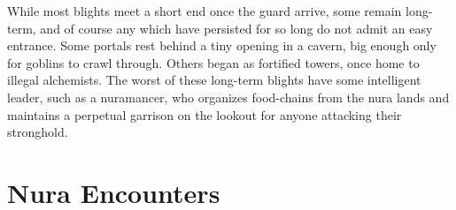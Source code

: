 \begin{multicols}{2}
While most blights meet a short end once the \gls{guard} arrive, some remain long-term, and of course any which have persisted for so long do not admit an easy entrance.
Some portals rest behind a tiny opening in a cavern, big enough only for goblins to crawl through.
Others began as fortified towers, once home to illegal alchemists.
The worst of these long-term blights have some intelligent leader, such as a nuramancer, who organizes food-chains from the nura lands and maintains a perpetual garrison on the lookout for anyone attacking their stronghold.

\end{multicols}

\section{Nura Encounters}

